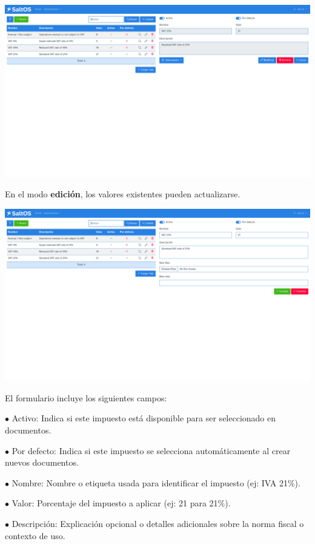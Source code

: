 \documentclass[a4paper]{article}
\begin{document}
\begin{center}\includegraphics[width=1\textwidth]{../ujest/snaps/test-screenshots-js-screenshots-sales-taxes-view-1-es-es-1-snap.png}\end{center}

En el modo \textbf{edición}, los valores existentes pueden actualizarse.

\begin{center}\includegraphics[width=1\textwidth]{../ujest/snaps/test-screenshots-js-screenshots-sales-taxes-edit-1-es-es-1-snap.png}\end{center}

El formulario incluye los siguientes campos:

\begin{compactitem}
\item[\color{myblue}$\bullet$] Activo: Indica si este impuesto está disponible para ser seleccionado en documentos.
\item[\color{myblue}$\bullet$] Por defecto: Indica si este impuesto se selecciona automáticamente al crear nuevos documentos.
\item[\color{myblue}$\bullet$] Nombre: Nombre o etiqueta usada para identificar el impuesto (ej: IVA 21\%).
\item[\color{myblue}$\bullet$] Valor: Porcentaje del impuesto a aplicar (ej: 21 para 21\%).
\item[\color{myblue}$\bullet$] Descripción: Explicación opcional o detalles adicionales sobre la norma fiscal o contexto de uso.
\end{compactitem}
\end{document}
